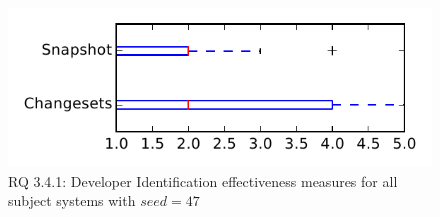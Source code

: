
\begin{figure}
\centering
\includegraphics[height=0.4\textheight]{figures/dit_seed/rq1_tiny_47}
\caption{RQ 3.4.1: Developer Identification effectiveness measures for all subject systems with $seed=47$}
\label{fig:dit_seed:rq1:tiny}
\end{figure}
